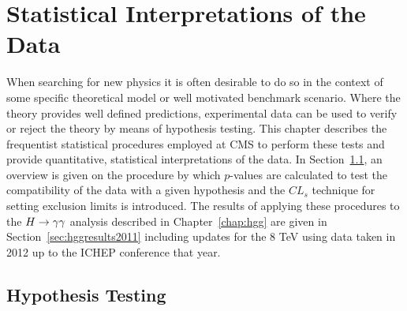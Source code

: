 \chapter{Statistical Interpretations of the Data}
\label{chap:statistics}

When searching for new physics it is often desirable to do so in the context of
some specific theoretical model or well motivated benchmark scenario.
Where the theory provides well defined predictions,
experimental data can be used to verify or reject the theory
by means of hypothesis testing. This chapter describes the frequentist statistical procedures 
employed at CMS to perform these tests and provide quantitative, statistical interpretations  
of the data. In Section~\ref{sec:hypothesistesting}, an overview is given on the procedure by 
which $p$-values are calculated to test the compatibility of the data with a given 
hypothesis and the $CL_{s}$ technique for setting exclusion limits is introduced. 
The results of applying these procedures to the $H\rightarrow\gamma\gamma$ analysis described in Chapter~\ref{chap:hgg} 
are given in Section~\ref{sec:hggresults2011} including updates for the 8 TeV using data taken 
in 2012 up to the ICHEP conference that year.


\section{Hypothesis Testing}
\label{sec:hypothesistesting}

